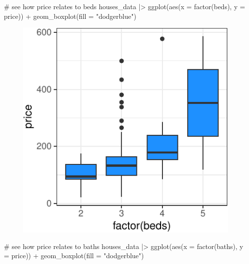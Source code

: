 \documentclass[
  11pt,
  letterpaper,
  oneside]{book}
\newenvironment{Shaded}{\begin{snugshade}}{\end{snugshade}}
\newcommand{\AttributeTok}[1]{\textcolor[rgb]{0.40,0.45,0.13}{#1}}
\newcommand{\CommentTok}[1]{\textcolor[rgb]{0.37,0.37,0.37}{#1}}
\newcommand{\FunctionTok}[1]{\textcolor[rgb]{0.28,0.35,0.67}{#1}}
\newcommand{\NormalTok}[1]{\textcolor[rgb]{0.00,0.23,0.31}{#1}}
\newcommand{\SpecialCharTok}[1]{\textcolor[rgb]{0.37,0.37,0.37}{#1}}
\newcommand{\StringTok}[1]{\textcolor[rgb]{0.13,0.47,0.30}{#1}}
\theoremstyle{definition}
\theoremstyle{plain}
\theoremstyle{plain}
\theoremstyle{plain}
\theoremstyle{remark}
\begin{document}
\begin{Shaded}
\begin{Highlighting}[]
\CommentTok{\# see how price relates to beds}
\NormalTok{houses\_data }\SpecialCharTok{|\textgreater{}}
  \FunctionTok{ggplot}\NormalTok{(}\FunctionTok{aes}\NormalTok{(}\AttributeTok{x =} \FunctionTok{factor}\NormalTok{(beds), }\AttributeTok{y =}\NormalTok{ price)) }\SpecialCharTok{+}
  \FunctionTok{geom\_boxplot}\NormalTok{(}\AttributeTok{fill =} \StringTok{"dodgerblue"}\NormalTok{)}
\end{Highlighting}
\end{Shaded}

\begin{figure}[H]

{\centering \includegraphics{r-demo-part-2_files/figure-pdf/unnamed-chunk-6-1.pdf}

}

\end{figure}

\begin{Shaded}
\begin{Highlighting}[]
\CommentTok{\# see how price relates to baths}
\NormalTok{houses\_data }\SpecialCharTok{|\textgreater{}}
  \FunctionTok{ggplot}\NormalTok{(}\FunctionTok{aes}\NormalTok{(}\AttributeTok{x =} \FunctionTok{factor}\NormalTok{(baths), }\AttributeTok{y =}\NormalTok{ price)) }\SpecialCharTok{+}
  \FunctionTok{geom\_boxplot}\NormalTok{(}\AttributeTok{fill =} \StringTok{"dodgerblue"}\NormalTok{)}
\end{Highlighting}
\end{Shaded}
\end{document}
